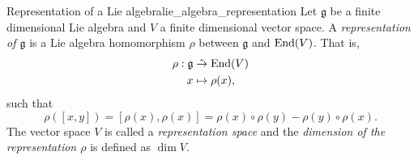 \begin{definition}{Representation of a Lie algebra}{lie_algebra_representation}
    Let \(\mathfrak{g}\) be a finite dimensional Lie algebra and \(V\) a finite dimensional vector space. A \emph{representation of \(\mathfrak{g}\)} is a Lie algebra homomorphism \(\rho\) between \(\mathfrak{g}\) and \(\operatorname{End}(V)\). That is,
    \begin{align*}
        \rho : \mathfrak{g} &\mathrel{\tilde{\to}} \operatorname{End}(V)\\
                          x &\mapsto \rho(x),
    \end{align*}
    such that
    \begin{equation*}
        \rho([x,y]) = [\rho(x), \rho(x)] = \rho(x) \circ \rho(y) - \rho(y) \circ \rho(x).
    \end{equation*}
    The vector space \(V\) is called a \emph{representation space} and the \emph{dimension of the representation \(\rho\)} is defined as \(\dim V\).
\end{definition}
